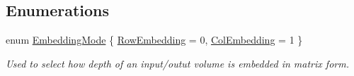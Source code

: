 \subsection*{Enumerations}
\begin{DoxyCompactItemize}
\item 
enum \hyperlink{namespaceffnn_1_1layer_1_1convolution_ad420d4eb8edd7c254d1f0aaaad81017f}{Embedding\-Mode} \{ \hyperlink{namespaceffnn_1_1layer_1_1convolution_ad420d4eb8edd7c254d1f0aaaad81017fa1c03b5145e31615496457aa687a180c2}{Row\-Embedding} = 0, 
\hyperlink{namespaceffnn_1_1layer_1_1convolution_ad420d4eb8edd7c254d1f0aaaad81017fae2ba27e8fa1aed3f003e54947f37d17e}{Col\-Embedding} = 1
 \}
\begin{DoxyCompactList}\small\item\em Used to select how depth of an input/outut volume is embedded in matrix form. \end{DoxyCompactList}\end{DoxyCompactItemize}
